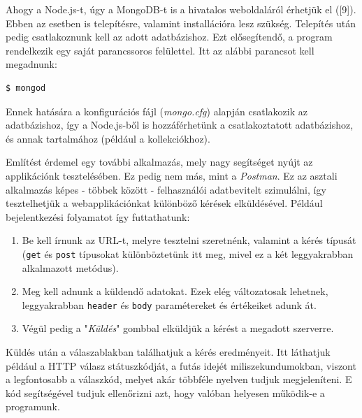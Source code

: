 Ahogy a Node.js-t, úgy a MongoDB-t is a hivatalos weboldaláról érhetjük el ([9]). Ebben az esetben is telepítésre, valamint installációra lesz szükség. Telepítés után pedig csatlakoznunk kell az adott adatbázishoz. Ezt elősegítendő, a program rendelkezik egy saját parancssoros felülettel. Itt az alábbi parancsot kell megadnunk:

\begin{verbatim}
$ mongod
\end{verbatim}

Ennek hatására a konfigurációs fájl (\textit{mongo.cfg}) alapján csatlakozik az adatbázishoz, így a Node.js-ből is hozzáférhetünk a csatlakoztatott adatbázishoz, és annak tartalmához (például a kollekciókhoz).

Említést érdemel egy további alkalmazás, mely nagy segítséget nyújt az applikációnk tesztelésében. Ez pedig nem más, mint a \textit{Postman}. Ez az asztali alkalmazás képes - többek között - felhasználói adatbevitelt szimulálni, így tesztelhetjük a webapplikációnkat különböző kérések elküldésével. Például bejelentkezési folyamatot így  futtathatunk:

\begin{enumerate}
\item{Be kell írnunk az URL-t, melyre tesztelni szeretnénk, valamint a kérés típusát (\texttt{get} és \texttt{post} típusokat különböztetünk itt meg, mivel ez a két leggyakrabban alkalmazott metódus).}
\item{Meg kell adnunk a küldendő adatokat. Ezek elég változatosak lehetnek, leggyakrabban \texttt{header} és \texttt{body} paramétereket és értékeiket adunk át.}
\item{Végül pedig a "\textit{Küldés}" gombbal elküldjük a kérést a megadott szerverre.}
\end{enumerate}

Küldés után a válaszablakban találhatjuk a kérés eredményeit. Itt láthatjuk például a HTTP válasz státuszkódját, a futás idejét miliszekundumokban, viszont a legfontosabb a válaszkód, melyet akár többféle nyelven tudjuk megjeleníteni. E kód segítségével tudjuk ellenőrizni azt, hogy valóban helyesen működik-e a programunk.


